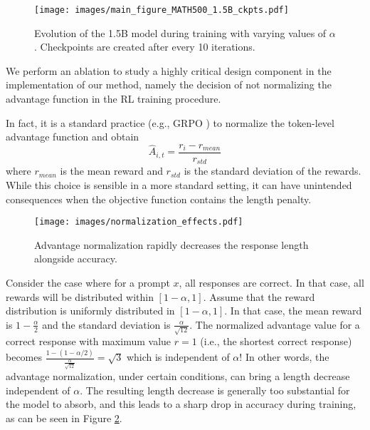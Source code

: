 \begin{figure}[h!]
\centering
\texttt{[image: images/main\_figure\_MATH500\_1.5B\_ckpts.pdf]}

\caption{Evolution of the 1.5B model during training with varying values of $\alpha$. Checkpoints are created after every 10 iterations.} 
\label{fig:ckpts}
\end{figure}


We perform an ablation to study a highly critical design component in the implementation of our method, namely the decision of not normalizing the advantage function in the RL training procedure.

In fact, it is a standard practice (e.g., GRPO 
\cite{shao2024deepseekmathpushinglimitsmathematical}) to
normalize the token-level advantage function and obtain 
\[
\hat{A}_{i,t} = \frac{r_i - r_{mean}}{r_{std}}
\]
where $r_{mean}$ is the mean reward and $r_{std}$ is the standard deviation of the rewards.
While this choice is sensible in a more standard setting, it can have unintended consequences when the objective function contains the length penalty.



\begin{figure}[h!]
  \centering
  \texttt{[image: images/normalization\_effects.pdf]}
  \caption{Advantage normalization rapidly decreases the response length alongside accuracy.}
  \label{fig:adv_normalization}
\end{figure}


Consider the case where for a prompt $x$, all responses are correct. In that case, all rewards will be distributed within $[1-\alpha, 1]$. Assume that the reward distribution is uniformly distributed in $[1-\alpha, 1]$. In that case, the mean reward is $1-\frac{\alpha}{2}$ and the standard deviation is $\frac{\alpha}{\sqrt{12}}$.
The normalized advantage value for a correct response with maximum value $r=1$ (i.e., the shortest correct response) becomes $\frac{1-(1-\alpha/2)}{\frac{\alpha}{\sqrt{12}}} = \sqrt{3}$ which is independent of $\alpha$! 
In other words, the advantage normalization, under certain conditions, can bring a length decrease independent of $\alpha$.
The resulting length decrease is generally too substantial for the model to absorb, and this leads to a sharp  drop in accuracy during training, as can be seen in Figure \ref{fig:adv_normalization}.

